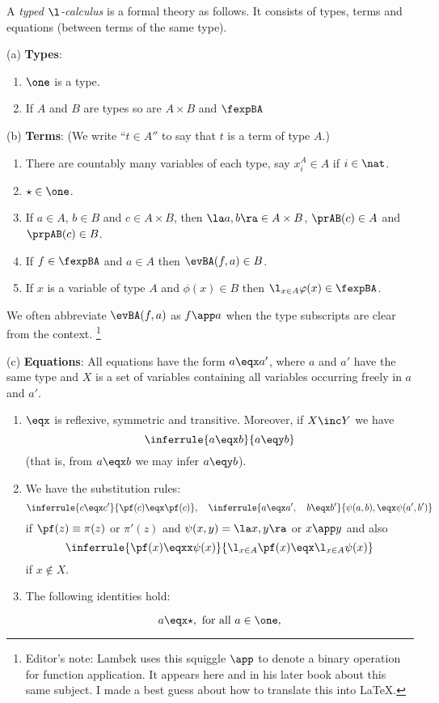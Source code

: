 \begin{defn}
A {\em typed $\l$-calculus} is a formal theory as follows. It
consists of types, terms and equations (between terms of the same type).

\medskip
\noindent
(a) {\bf Types}:
\begin{enumerate}[label=(a\theenumi)]
\item $\one$ is a type.
\item If $A$ and $B$ are types so are $A \times B$ and $\fexpBA$
\end{enumerate}

\medskip
\noindent
(b) {\bf Terms}: (We write ``$t \in A''$ to say that $t$ is a term of type $A$.)
\begin{enumerate}[label=(b\theenumi)]
\item There are countably many variables of each type, say $x^{A}_{i} \in A$ if $i \in \nat$.
\item $\star \in \one$.
\item If $a \in A$, $b \in B$ and $c \in A \times B$, then $\la a,b \ra \in A \times B$, $\prAB(c) \in A$ and $\prpAB(c) \in B$.
\item If $f \in \fexpBA$ and $a \in A$ then $\evBA(f,a) \in B$.
\item If $x$ is a variable of type $A$ and $\phi(x) \in B$ then $\lxa{\varphi(x)} \in \fexpBA$.
\end{enumerate}
\noindent
We often abbreviate $\evBA(f,a)$ as $f \app a$ when the type subscripts are clear
from the context.%
\footnote{Editor's note: Lambek uses this squiggle $\app$ to denote a binary operation for
function application. It appears here and in his later book about this same subject. I
made a best guess about how to translate this into \LaTeX.}


\def\lxa{\l_{x\in A}}

\medskip
\noindent
(c) {\bf Equations}: All equations have the form $a \eqx a'$, where $a$ and $a'$ have
the same type and $X$ is a set of variables containing all variables occurring
freely in $a$ and $a'$.
\begin{enumerate}[label=(c\theenumi)]
\item $\eqx$ is reflexive, symmetric and transitive. Moreover, if $X \inc Y$ we have
\[
\inferrule{a \eqx b}{a \eqy b}
\]
(that is, from $a \eqx b$ we may infer $a \eqy b$).
\item We have the substitution rules:
\[
\inferrule{c \eqx c'}{\pf(c) \eqx \pf(c)}, \quad 
\inferrule{a \eqx a', \quad b \eqx b'}{\psi(a,b), \eqx \psi(a',b')}
\]
if $\pf(z) \equiv \pi(z)$ or $\pi'(z)$ and $\psi(x,y) = \la x,y \ra$ or $x \app y$ and also
\[
\inferrule{\pf(x) \eqxx \psi(x)}{\lxa\pf(x) \eqx \lxa\psi(x)}
\]
if $x \notin X$.
\item The following identities hold:
\begin{fleqn}
\[a \eqx \star, \hbox{ for all } a \in \one,\]


\end{fleqn}
\end{enumerate}
\end{defn}
